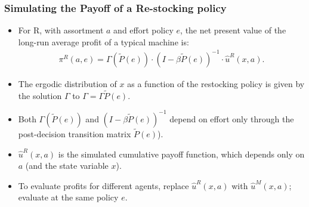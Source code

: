 \documentclass[aspectratio=169,11pt]{beamer}
\begin{document}

\begin{frame}[label=supplemental2]
\frametitle{Simulating the Payoff of a Re-stocking policy}
\vfill
\begin{itemize}
\item For R, with assortment $a$ and effort policy $e$, the net present value of the long-run average profit of a typical machine is: 
\begin{eqnarray}
\label{retail_payoffs}
\pi^R(a,e) = \Gamma(\tilde{P}(e)) \cdot(I - \beta \tilde{P}(e))^{-1} \cdot \hat{u}^R(x,a).
\end{eqnarray}
\item The ergodic distribution of $x$ as a function of the restocking policy is given by the solution $\Gamma$ to $\Gamma= \Gamma \tilde{P}(e). $ 
\item  Both $\Gamma(\tilde{P}(e))$ and $(I - \beta \tilde{P}(e))^{-1}$ depend on effort only through the post-decision transition matrix $\tilde{P}(e)$). 
\item $\hat{u}^R(x,a)$ is the simulated cumulative payoff function, which depends only on $a$ (and the state variable $x$). 
\item To evaluate profits for different agents, replace $\hat{u}^R(x,a)$ with $\hat{u}^M(x,a)$; evaluate at the same policy $e$.
\end{itemize}
\vfill
\hyperlink{main}{}
\end{frame}
\end{document}
